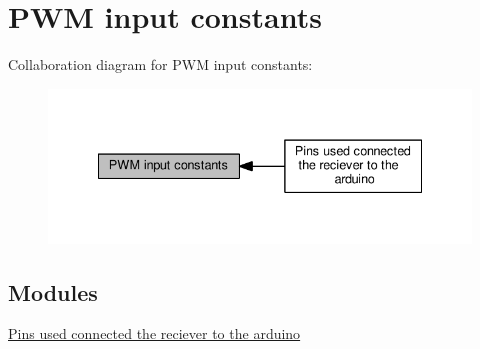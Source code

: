 \hypertarget{group__PwmInputConstants}{}\section{P\+WM input constants}
\label{group__PwmInputConstants}
Collaboration diagram for P\+WM input constants\+:\nopagebreak
\begin{figure}[H]
\begin{center}
\leavevmode
\includegraphics[width=335pt]{group__PwmInputConstants}
\end{center}
\end{figure}
\subsection*{Modules}
\begin{DoxyCompactItemize}
\item 
\hyperlink{group__RecieverPwmPins}{Pins used connected the reciever to the arduino}
\end{DoxyCompactItemize}
